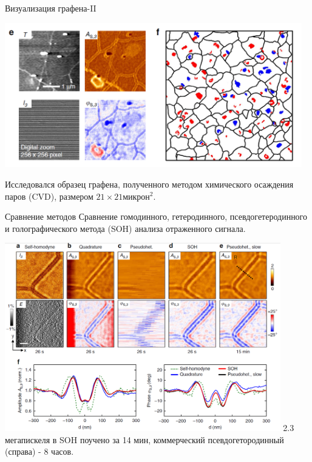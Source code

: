 \documentclass[9pt, compress, xcolor=table]{beamer}
\begin{document}
\begin{frame}{Визуализация графена-II}

\begin{center}
\includegraphics[width=0.97\textwidth]{hillen_5}

Исследовался образец графена, полученного методом химического осаждения паров (CVD), размером $21\times21 \text{микрон}^2$.

\end{center}
\end{frame}

\begin{frame}{Сравнение методов}
Сравнение гомодинного, гетеродинного, псевдогетеродинного и голографического метода (SOH) анализа отраженного сигнала.
\begin{center}
\includegraphics[width=0.9\textwidth]{hillen_6}
\small{2.3 мегапискеля в SOH поучено за 14 мин, коммерческий псевдогетородинный (справа) - 8 часов.}

\end{center}
\end{frame}

\end{document}
